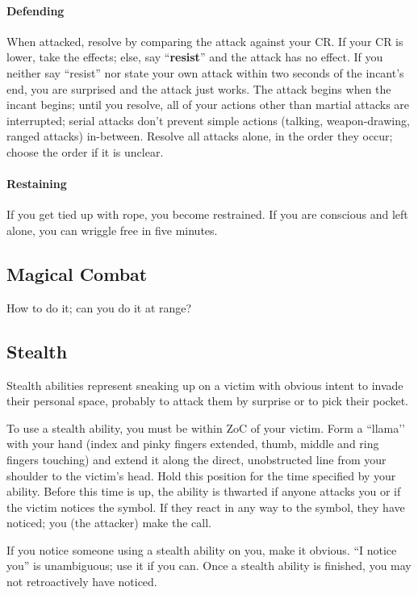 \documentclass[sheet]{GL2020}
\begin{document}
\paragraph{Defending} When attacked, resolve by comparing the attack against your CR.  If your CR is lower, take the effects; else, say ``{\bf resist}'' and the attack has no effect.  If you neither say ``resist'' nor state your own attack within two seconds of the incant's end, you are surprised and the attack just works.  The attack begins when the incant begins; until you resolve, all of your actions other than martial attacks are interrupted; serial attacks don't prevent simple actions (talking, weapon-drawing, ranged attacks) in-between. Resolve all attacks alone, in the order they occur; choose the order if it is unclear.

\paragraph{Restaining} If you get tied up with rope, you become restrained.  If you are conscious and left alone, you can wriggle free in five minutes.

\subsection{Magical Combat}

How to do it; can you do it at range?

\subsection{Stealth}

Stealth abilities represent sneaking up on a victim with obvious intent to invade their personal space, probably to attack them by surprise or to pick their pocket.

To use a stealth ability, you must be within ZoC of your victim.  Form a ``llama’’ with your hand (index and pinky fingers extended, thumb, middle and ring fingers touching) and extend it along the direct, unobstructed line from your shoulder to the victim's head.  Hold this position for the time specified by your ability.  Before this time is up, the ability is thwarted if anyone attacks you or if the victim notices the symbol.  If they react in any way to the symbol, they have noticed; you (the attacker) make the call.

If you notice someone using a stealth ability on you, make it obvious. ``I notice you'' is unambiguous; use it if you can.  Once a stealth ability is finished, you may not retroactively have noticed.
\end{document}
